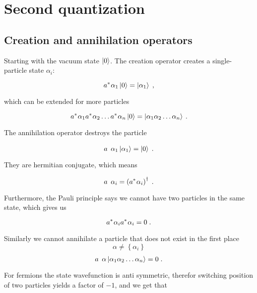 \section{Second quantization}
\subsection{Creation and annihilation operators}

Starting with the vacuum state $\ket{0}$. The creation operator creates a single-particle state $\alpha_i$:

\begin{equation}
    \hc{a}{\alpha_1} \ket{0} = \ket{\alpha_1} \; ,
\end{equation}

which can be extended for more particles

\begin{equation}
    \hc{a}{\alpha_1}\hc{a}{\alpha_2}\dots \hc{a}{\alpha_n}\ket{0} = \ket{\alpha_1\alpha_2\dots\alpha_n} \: .
\end{equation}

The annihilation operator destroys the particle

\begin{equation}
    \op{a}{\alpha_1} \ket{\alpha_1} = \ket{0} \; .
\end{equation}

They are hermitian conjugate, which means

\begin{equation}
    \op{a}{\alpha_i} = \left ( \hc{a}{\alpha_i} \right ) ^ {\dagger} \; .
\end{equation}

Furthermore, the Pauli principle says we cannot have two particles in the same state, which gives us

\begin{equation}
    \hc{a}{\alpha_i} \hc{a}{\alpha_i} = 0 \; .
\end{equation}

Similarly we cannot annihilate a particle that does not exist in the first place
$$\alpha \neq \left \{ \alpha_i\right \}$$
\begin{equation}
    \op{a}{\alpha} \ket{\alpha_1 \alpha_2 \dots \alpha_n} = 0 \; . 
\end{equation}

For fermions the state wavefunction is anti symmetric, therefor switching position of two particles yields a factor of $-1$, and we get that

